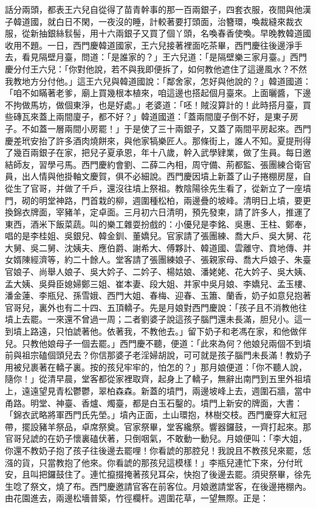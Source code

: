 \begin{showcontents}{}
話分兩頭，都表王六兒自從得了苗青幹事的那一百兩銀子，四套衣服，夜間與他漢子韓道國，就白日不閑，一夜沒的睡，計較著要打頭面，治簪環，喚裁縫來裁衣服，從新抽銀絲䯼髻，用十六兩銀子又買了個丫頭，名喚春香使喚。早晚教韓道國收用不題。一日，西門慶韓道國家，王六兒接著裡面吃茶畢，西門慶往後邊淨手去，看見隔壁月臺，問道：「是誰家的？」王六兒道：「是隔壁樂三家月臺。」西門慶分付王六兒：「你對他說，若不與我即便拆了，如何教他遮住了這邊風水？不然我教地方分付他。」這王六兒與韓道國說：「鄰舍家，怎好與他說的？」韓道國道：「咱不如瞞著老爹，廟上買幾根本植來，咱這邊也搭起個月臺來。上面曬醬，下邊不拘做馬坊，做個東淨，也是好處。」老婆道：「呸！賊沒算計的！此時搭月臺，買些磚瓦來蓋上兩間廈子，都不好？」韓道國道：「蓋兩間廈子倒不好，是東子房子。不如蓋一層兩間小房罷！」于是使了三十兩銀子，又蓋了兩間平房起來。西門慶差玳安抬了許多酒肉燒餅來，與他家犒樂匠人。那條街上，誰人不知。夏提刑得了幾百兩銀子在家，把兒子夏承恩，年十八歲，幹入武學肄業，做了生員。每日邀結師友，習學弓馬。西門慶約會劉、二薛二內相，周守備、荊都監、張團練合衛官員，出人情與他掛軸文慶賀，俱不必細說。西門慶因墳上新蓋了山子捲棚房屋，自從生了官哥，并做了千戶，還沒往墳上祭祖。教陰陽徐先生看了，從新立了一座墳門，砌的明堂神路，門首栽的柳，週圍種松柏，兩邊疊的坡峰。清明日上墳，要更換錦衣牌面，宰豬羊，定卓面。三月初六日清明，預先發柬，請了許多人，推運了東西，酒米下飯菜蔬。叫的樂工雜耍扮戲的：小優兒是李銘、吳惠、王柱、鄭奉，唱的是李桂姐、吳銀兒、韓金釧、董嬌兒。官家請了張團練、喬大戶、吳大舅、花大舅、吳二舅、沈姨夫、應伯爵、謝希大、傅夥計、韓道國、雲離守、賁地傳、并女婿陳經濟等，約二十餘人。堂客請了張團練娘子、張親家母、喬大戶娘子、朱臺官娘子、尚舉人娘子、吳大妗子、二妗子、楊姑娘、潘姥姥、花大妗子、吳大姨、孟大姨、吳舜臣媳婦鄭三姐、崔本妻、段大姐、并家中吳月娘、李嬌兒、孟玉樓、潘金蓮、李瓶兒、孫雪娥、西門大姐、春梅、迎春、玉簫、蘭香，奶子如意兒抱著官哥兒，裏外也有二十四、五頂轎子。先是月娘對西門慶說：「孩子且不消教他往墳上去罷。一來還不曾過一周；二者劉婆子說這孩子腦門還未長滿，胆兒小。這一到墳上路遠，只怕諕著他。依著我，不教他去。」留下奶子和老馮在家，和他做伴兒。只教他娘母子一個去罷。」西門慶不聽，便道：「此來為何？他娘兒兩個不到墳前與祖宗磕個頭兒去？你信那婆子老淫婦胡說，可可就是孩子腦門未長滿！教奶子用被兒裹著在轎子裏。按的孩兒牢牢的，怕怎的？」那月娘便道：「你不聽人說，隨你！」從清早晨，堂客都從家裡取齊，起身上了轎子，無辭出南門到五里外祖墳上，遠遠望見青松鬱鬱，翠柏森森。新蓋的墳門，兩邊坡峰上去，週圍石牆，當中甬路。明堂、神臺、香爐、燭臺，都是白玉石鑿的。墳門上新安的牌面，大書：「錦衣武略將軍西門氏先塋。」墳內正面，土山環抱，林樹交枝。西門慶穿大紅冠帶，擺設豬羊祭品，卓席祭奠。官家祭畢，堂客纔祭。響器鑼鼓，一齊打起來。那官哥兒諕的在奶子懷裏磕伏著，只倒咽氣，不敢動一動兒。月娘便叫：「李大姐，你還不教奶子抱了孩子往後邊去罷哩！你看諕的那腔兒！我說且不教孩兒來罷，恁漒的貨，只當教抱了他來。你看諕的那孩兒這模樣！」李瓶兒連忙下來，分付玳安，且叫把鑼鼓住了。連忙攛掇掩著孩兒耳朵，快抱了後邊去罷。須臾祭畢，徐先生唸了祭文，燒了布。西門慶邀請官客在前客位。月娘邀請堂客，在後邊捲棚內。由花園進去，兩邊松墻普築，竹徑欄杆。週圍花草，一望無際。正是：


\end{showcontents}
